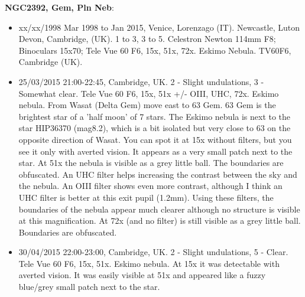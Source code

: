 {\bf NGC2392, Gem, Pln Neb}:
\begin{itemize}
\item xx/xx/1998 Mar 1998 to Jan 2015, Venice, Lorenzago (IT). Newcastle, Luton Devon, Cambridge, (UK). 1 to 3, 3 to 5. Celestron Newton 114mm F8; Binoculars 15x70; Tele Vue 60 F6, 15x, 51x, 72x. Eskimo Nebula. TV60F6, Cambridge (UK).
\item 25/03/2015 21:00-22:45, Cambridge, UK. 2 - Slight undulations, 3 - Somewhat clear. Tele Vue 60 F6, 15x, 51x +/- OIII, UHC, 72x. Eskimo nebula. From Wasat (Delta Gem) move east to 63 Gem. 63 Gem is the brightest star of a 'half moon' of 7 stars. The Eskimo nebula is next to the star HIP36370 (mag8.2), which is a bit isolated but very close to 63 on the opposite direction of Wasat. You can spot it at 15x without filters, but you see it only with averted vision. It appears as a very small patch next to the star. At 51x the nebula is visible as a grey little ball. The boundaries are obfuscated. An UHC filter helps increasing the contrast between the sky and the nebula. An OIII filter shows even more contrast, although I think an UHC filter is better at this exit pupil (1.2mm). Using these filters, the boundaries of the nebula appear much clearer although no structure is visible at this magnification. At 72x (and no filter) is still visible as a grey little ball. Boundaries are obfuscated.  
\item 30/04/2015 22:00-23:00, Cambridge, UK. 2 - Slight undulations, 5 - Clear. Tele Vue 60 F6, 15x, 51x. Eskimo nebula. At 15x it was detectable with averted vision. It was easily visible at 51x and appeared like a fuzzy blue/grey small patch next to the star. 
\end{itemize}
